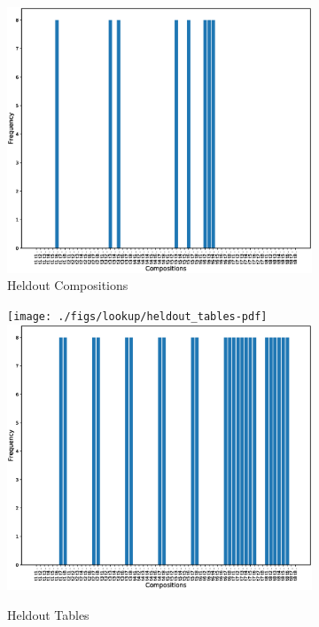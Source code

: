 \begin{figure}[ht]
\begin{subfigure}{0.5\linewidth}
		\includegraphics[width=0.95\linewidth]{./figs/lookup/heldout_compositions-eps}
		\fi
		\caption{Heldout Compositions}\label{fig:held_comp}
	\end{subfigure}
	\begin{subfigure}{0.5\linewidth}
		\ifpdf
		\texttt{[image: ./figs/lookup/heldout\_tables-pdf]}
		\else
		\includegraphics[width=0.95\linewidth]{./figs/lookup/heldout_tables-eps}
		\fi
		\caption{Heldout Tables}\label{fig:held_tab}
	\end{subfigure}
	\begin{subfigure}{0.5\linewidth}

\end{subfigure}
\end{figure}
